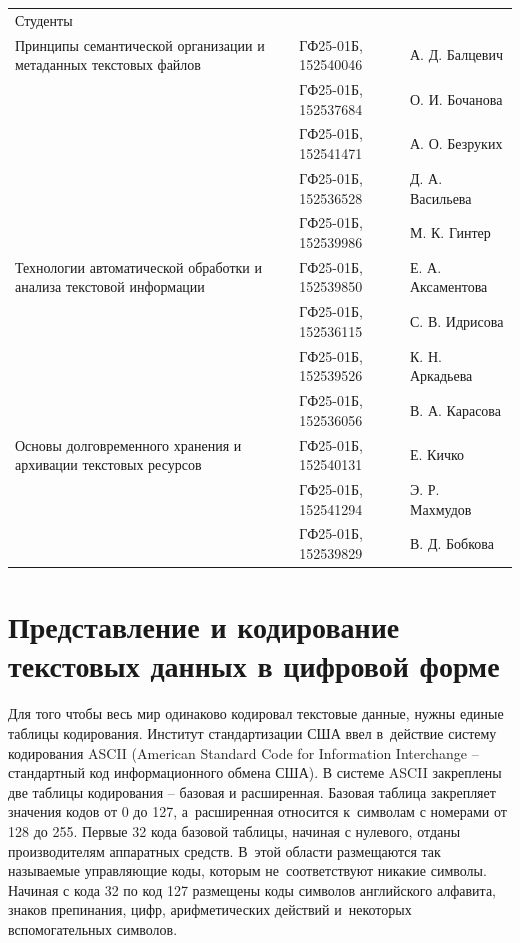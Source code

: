 \documentclass{ou}
\begin{document}
\begin{flushleft}
\doublespacing
\begin{tabularx}{\textwidth}{@{} p{} l l @{}}
Студенты     &                     &         \\
\multirow{-2.27}{\hsize}{\singlespacing Принципы семантической организации и метаданных текстовых файлов}
             & ГФ25-01Б, 152540046 & А. Д. Балцевич\\
             & ГФ25-01Б, 152537684 & О. И. Бочанова\\
             & ГФ25-01Б, 152541471 & А. О. Безруких\\
             & ГФ25-01Б, 152536528 & Д. А. Васильева\\
             & ГФ25-01Б, 152539986 & М. К. Гинтер\\
\multirow{-2.27}{\hsize}{\singlespacing Технологии автоматической обработки и анализа текстовой информации}
             & ГФ25-01Б, 152539850 & Е. А. Аксаментова\\
             & ГФ25-01Б, 152536115 & С. В. Идрисова\\
             & ГФ25-01Б, 152539526 & К. Н. Аркадьева\\
             & ГФ25-01Б, 152536056 & В. А. Карасова\\
\multirow{-2.27}{\hsize}{\singlespacing Основы долговременного хранения и архивации текстовых ресурсов}
             & ГФ25-01Б, 152540131 & Е. Кичко\\
             & ГФ25-01Б, 152541294 & Э. Р. Махмудов\\
             & ГФ25-01Б, 152539829 & В. Д. Бобкова\\
\end{tabularx}
\end{flushleft}
\newpage
{
\sloppy
\tableofcontents
}
\newpage
\onehalfspacing
\section{Представление и кодирование текстовых данных в цифровой форме}
Для того чтобы весь мир одинаково кодировал текстовые данные, нужны единые таблицы кодирования. Институт стандартизации США ввел в~действие систему кодирования ASCII (American Standard Code for Information Interchange -- стандартный код информационного обмена США). В системе ASCII закреплены две таблицы кодирования -- базовая и расширенная. Базовая таблица закрепляет значения кодов от 0 до 127, а~расширенная относится к~символам с номерами от 128 до 255. Первые 32 кода базовой таблицы, начиная с нулевого, отданы производителям аппаратных средств. В~этой области размещаются так называемые управляющие коды, которым не~соответствуют никакие символы. Начиная с кода 32 по код 127 размещены коды символов английского алфавита, знаков препинания, цифр, арифметических действий и~некоторых вспомогательных символов. 
\end{document}
